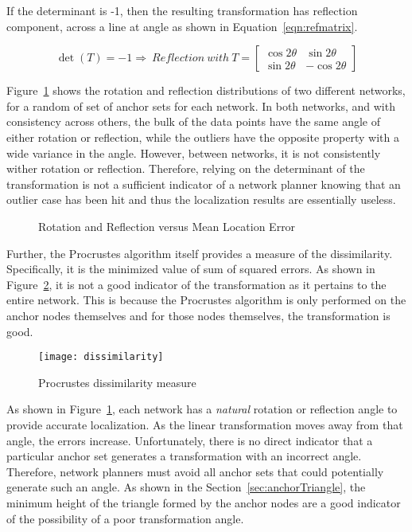 If the determinant is -1, then the resulting transformation has reflection component, across a line at angle as shown in Equation~\ref{eqn:refmatrix}. 

\begin{equation}
	\det{(T)}=-1 \Rightarrow ~Reflection ~with ~T=
	\begin{bmatrix}
	\cos{2{\theta}} & \sin{2{\theta}} \\ 
	\sin{2{\theta}} & -\cos{2{\theta}}\end{bmatrix}
	\label{eqn:refmatrix} 
\end{equation}

Figure~\ref{fig:rotref} shows the rotation and reflection distributions of two different networks, for a random of set of anchor sets for each network.  In both networks, and with consistency across others, the bulk of the data points have the same angle of either rotation or reflection, while the outliers have the opposite property with a wide variance in the angle.  However, between networks, it is not consistently wither rotation or reflection.  Therefore, relying on the determinant of the transformation is not a sufficient indicator of a network planner knowing that an outlier case has been hit and thus the localization results are essentially useless.

\begin{figure}
  \centering
	\caption{Rotation and Reflection versus Mean Location Error}	
	\label{fig:rotref}
\end{figure}

Further, the Procrustes algorithm itself provides a measure of the dissimilarity.  Specifically, it is the minimized value of sum of squared errors\cite{procrustes-matlab}.  As shown in Figure~\ref{fig:dissimilarity}, it is not a good indicator of the transformation as it pertains to the entire network.  This is because the Procrustes algorithm is only performed on the anchor nodes themselves and for those nodes themselves, the transformation is good.

\begin{figure}
  \centering
	\texttt{[image: dissimilarity]}
	\caption{Procrustes dissimilarity measure}	
	\label{fig:dissimilarity}
\end{figure}

As shown in Figure~\ref{fig:rotref}, each network has a \emph{natural} rotation or reflection angle to provide accurate localization.  As the linear transformation moves away from that angle, the errors increase.  Unfortunately, there is no direct indicator that a particular anchor set generates a transformation with an incorrect angle.  Therefore, network planners must avoid all anchor sets that could potentially generate such an angle.  As shown in the Section~\ref{sec:anchorTriangle}, the minimum height of the triangle formed by the anchor nodes are a good indicator of the possibility of a poor transformation angle.  

